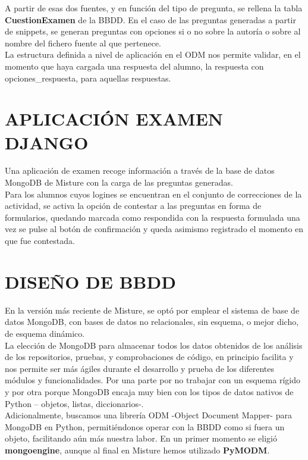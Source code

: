 A partir de esas dos fuentes, y en función del tipo de pregunta, se rellena la tabla \textbf{CuestionExamen} de la BBDD. En el caso de las preguntas generadas a partir de snippets, se generan preguntas con opciones si o no sobre la autoría o sobre al nombre del fichero fuente al que pertenece.\\


La estructura definida a nivel de aplicación en el ODM nos permite validar, en el momento que haya cargada una respuesta del alumno, la respuesta con opciones\_respuesta, para aquellas respuestas.\\


\section{APLICACIÓN EXAMEN DJANGO}

Una aplicación de examen recoge información a través de la base de datos MongoDB de Misture con la carga de las preguntas generadas.\\


Para los alumnos cuyos logines se encuentran en el conjunto de correcciones de la actividad, se activa la opción de contestar a las preguntas en forma de formularios, quedando marcada como respondida con la respuesta formulada una vez se pulse al botón de confirmación y queda asimismo registrado el momento en que fue contestada.


\section{DISEÑO DE BBDD} 
\label{sec:bbdd}

En la versión más reciente de Misture, se optó por emplear el sistema de base de datos MongoDB, con bases de datos no relacionales, sin esquema, o mejor dicho, de esquema dinámico.\\


La elección de MongoDB para almacenar todos los datos obtenidos de los análisis de los repositorios, pruebas, y comprobaciones de código, en principio facilita y nos permite ser más ágiles durante el desarrollo y prueba de los diferentes módulos y funcionalidades. Por una parte por no trabajar con un esquema rígido y por otra porque MongoDB encaja muy bien con los tipos de datos nativos de Python – objetos, listas, diccionarios-.\\


Adicionalmente, buscamos una librería ODM -Object Document Mapper- para MongoDB en Python, permitiéndonos operar con la BBDD como si fuera un objeto, facilitando aún más nuestra labor. En un primer momento se eligió \textbf{mongoengine}, aunque al final en Misture hemos utilizado \textbf{PyMODM}.\\


